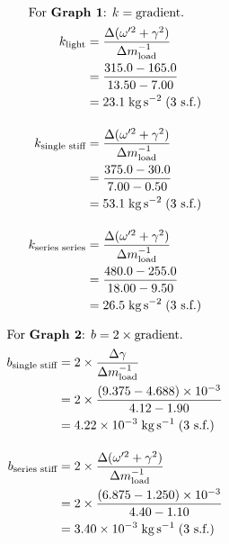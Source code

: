 \begin{strip}
\vspace{-4em}
\begin{multicols}{2}
\noindent
\begin{align*}
\intertext{For $\textbf{Graph 1}$: $k = \text{gradient}$.}
k_{\text{light}} &= \frac{\Delta (\omega'^2 + \gamma^2)}{\Delta m_{\text{load}}^{-1}} \\
&= \frac{315.0 - 165.0}{13.50 - 7.00} \\
&= 23.1 \; \si{\kilo\gram\per\second\squared} \; \text{(3 s.f.)} \\[1em]
k_{\text{single stiff}} &= \frac{\Delta (\omega'^2 + \gamma^2)}{\Delta m_{\text{load}}^{-1}} \\
&= \frac{375.0 - 30.0}{7.00 - 0.50} \\
&= 53.1 \; \si{\kilo\gram\per\second\squared} \; \text{(3 s.f.)} \\[1em]
k_{\text{series series}} &= \frac{\Delta (\omega'^2 + \gamma^2)}{\Delta m_{\text{load}}^{-1}} \\
&= \frac{480.0 - 255.0}{18.00 - 9.50} \\
&= 26.5 \; \si{\kilo\gram\per\second\squared} \; \text{(3 s.f.)}
\end{align*}

\columnbreak

\noindent
\begin{align*}
\intertext{For $\textbf{Graph 2}$: $b = 2 \times \text{gradient}$.}
b_{\text{single stiff}} &= 2 \times \frac{\Delta \gamma}{\Delta m_{\text{load}}^{-1}} \\
&= 2 \times \frac{\left(9.375 - 4.688 \right) \times 10^{-3}}{4.12 - 1.90} \\
&= 4.22 \times 10^{-3} \; \si{\kilo\gram\per\second} \; \text{(3 s.f.)} \\[1em]
b_{\text{series stiff}} &= 2 \times \frac{\Delta (\omega'^2 + \gamma^2)}{\Delta m_{\text{load}}^{-1}} \\
&= 2 \times \frac{\left(6.875 - 1.250 \right) \times 10^{-3}}{4.40 - 1.10} \\
&= 3.40 \times 10^{-3} \; \si{\kilo\gram\per\second} \; \text{(3 s.f.)}
\end{align*}
\end{multicols}
\end{strip}
\nopagebreak